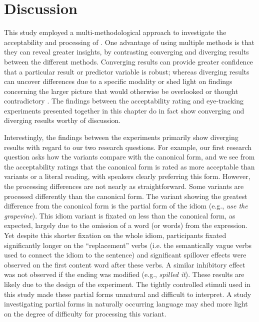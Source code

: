 \documentclass[output=paper,modfonts,nonflat]{langsci/langscibook}
\begin{document}




\section{Discussion} 

This study employed a multi-methodological  approach to investigate the acceptability and processing of . One advantage of using multiple methods is that they can reveal greater insights, by contrasting converging and diverging results between the different methods. Converging results can provide greater confidence that a particular result or predictor variable is robust; whereas diverging results can uncover differences due to a specific modality or shed light on findings concerning the larger picture that would otherwise be overlooked or thought contradictory \citep{ArppeJarvikivi2007}. The findings between the acceptability rating and eye-tracking experiments presented together in this chapter do in fact show converging and diverging results  worthy of discussion.

Interestingly, the findings between the experiments primarily show diverging results with regard to our two research questions. For example, our first research question asks how the variants compare with the canonical form, and we see from the acceptability ratings that the canonical form is rated as more acceptable than variants or a literal reading, with speakers clearly preferring this form. However, the processing differences are not nearly as straightforward. Some variants are processed differently than the canonical form. The variant showing the greatest difference from the canonical form is the partial form of the idiom (e.g., \textit{use the grapevine}). This idiom variant is fixated on less than the canonical form, as expected, largely due to the omission of a word (or words) from the expression. Yet despite this shorter fixation on the whole idiom, participants fixated significantly longer on the ``replacement'' verbs (i.e. the semantically vague verbs used to connect the idiom to the sentence) and significant spillover effects were observed on the first content word after these verbs. A similar inhibitory effect was not observed if the ending was modified (e.g., \textit{spilled it}). These results are likely due to the design of the experiment. The tightly controlled stimuli used in this study made these partial forms unnatural and difficult to interpret. A study investigating partial forms in naturally occurring language may shed more light on the degree of difficulty for processing this variant.
\end{document}
